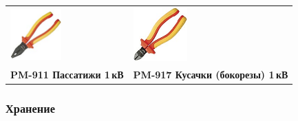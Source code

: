 \begin{tabular}{p{} p{}}
\noindent\includegraphics[width=0.45\textwidth]{tech/tools/proskit/PM-911.jpg}
&
\noindent\includegraphics[width=0.35\textwidth]{tech/tools/proskit/PM-917.jpg}
\\

\textbf{PM-911 Пассатижи 1\,кВ}
&
\textbf{PM-917 Кусачки (бокорезы) 1\,кВ}
\\
\end{tabular}
\clearpage

\subsubsection{Хранение}

